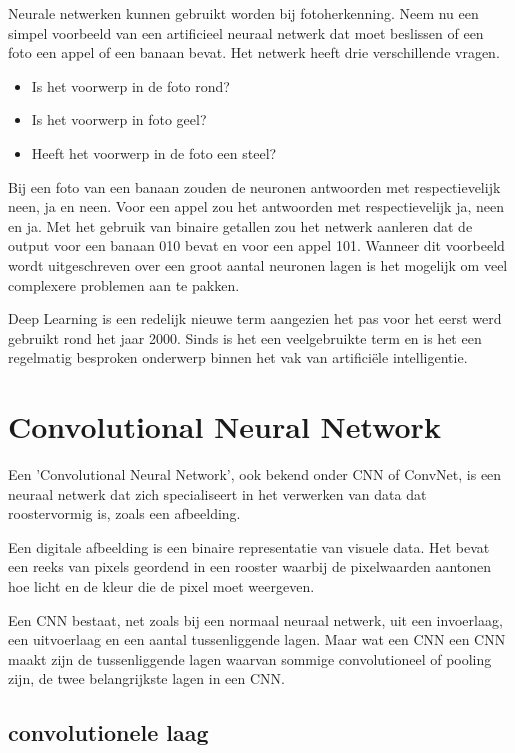 Neurale netwerken kunnen gebruikt worden bij fotoherkenning.
Neem nu een simpel voorbeeld van een artificieel neuraal netwerk dat moet beslissen of een foto een appel of een banaan bevat.
Het netwerk heeft drie verschillende vragen.


\begin{itemize}
	\item Is het voorwerp in de foto rond?
	\item Is het voorwerp in foto geel?
	\item Heeft het voorwerp in de foto een steel?
\end{itemize}

Bij een foto van een banaan zouden de neuronen antwoorden met respectievelijk neen, ja en neen. Voor een appel zou het antwoorden met respectievelijk ja, neen en ja. Met het gebruik van binaire getallen zou het netwerk aanleren dat de output voor een banaan 010 bevat en voor een appel 101.
Wanneer dit voorbeeld wordt uitgeschreven over een groot aantal neuronen lagen is het mogelijk om veel complexere problemen aan te pakken.

Deep Learning is een redelijk nieuwe term aangezien het pas voor het eerst werd gebruikt rond het jaar 2000. Sinds is het een veelgebruikte term en is het een regelmatig besproken onderwerp binnen het vak van artificiële intelligentie. \autocite{Goff2018}


\section{Convolutional Neural Network}

Een 'Convolutional Neural Network', ook bekend onder CNN of ConvNet, is een neuraal netwerk dat zich specialiseert in het verwerken van data dat roostervormig is, zoals een afbeelding. 


Een digitale afbeelding is een binaire representatie van visuele data. Het bevat een reeks van pixels geordend in een rooster waarbij de pixelwaarden aantonen hoe licht en de kleur die de pixel moet weergeven.

Een CNN bestaat, net zoals bij een normaal neuraal netwerk, uit een invoerlaag, een uitvoerlaag en een aantal tussenliggende lagen.
Maar wat een CNN een CNN maakt zijn de tussenliggende lagen waarvan sommige convolutioneel of pooling zijn, de twee belangrijkste lagen in een CNN.

\subsection{convolutionele laag}




